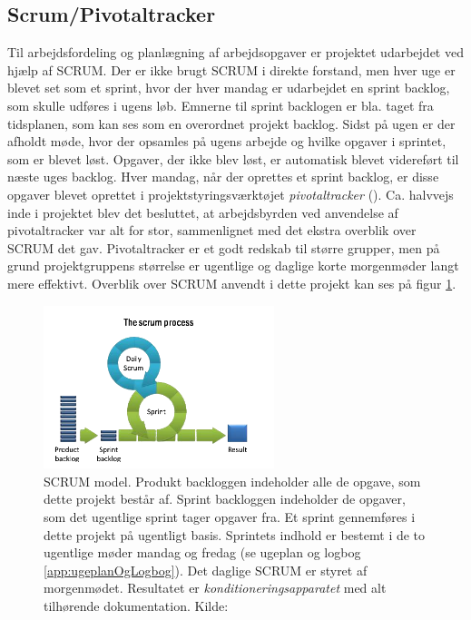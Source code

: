 \subsection{Scrum/Pivotaltracker} \label{title:scrum}
Til arbejdsfordeling og planlægning af arbejdsopgaver er projektet udarbejdet ved hjælp af SCRUM. Der er ikke brugt SCRUM i direkte forstand, men hver uge er blevet set som et sprint, hvor der hver mandag er udarbejdet en sprint backlog, som skulle udføres i ugens løb. Emnerne til sprint backlogen er bla. taget fra tidsplanen, som kan ses som en overordnet projekt backlog. Sidst på ugen er der afholdt møde, hvor der opsamles på ugens arbejde og hvilke opgaver i sprintet, som er blevet løst. Opgaver, der ikke blev løst, er automatisk blevet videreført til næste uges backlog. Hver mandag, når der oprettes et sprint backlog, er disse opgaver blevet oprettet i projektstyringsværktøjet \textit{pivotaltracker} (\cite{RefWorks:36}). Ca. halvvejs inde i projektet blev det besluttet, at arbejdsbyrden ved anvendelse af pivotaltracker var alt for stor, sammenlignet med det ekstra overblik over SCRUM det gav. Pivotaltracker er et godt redskab til større grupper, men på grund projektgruppens størrelse er ugentlige og daglige korte morgenmøder langt mere effektivt. Overblik over SCRUM anvendt i dette projekt kan ses på figur \ref{fig:scrumProcess}.

	\begin{figure}[H]
		\centering
		\includegraphics[width = 0.6\textwidth]{billeder/scrumProcess.png}
		\caption{SCRUM model. Produkt backloggen indeholder alle de opgave, som dette projekt består af. Sprint backloggen indeholder de opgaver, som det ugentlige sprint tager opgaver fra. Et sprint gennemføres i dette projekt på ugentligt basis. Sprintets indhold er bestemt i de to ugentlige møder mandag og fredag (se ugeplan og logbog \ref{app:ugeplanOgLogbog}). Det daglige SCRUM er styret af morgenmødet. Resultatet er \textit{konditioneringsapparatet} med alt tilhørende dokumentation. Kilde: \cite{Billede:1}}\label{fig:scrumProcess}
	\end{figure}

